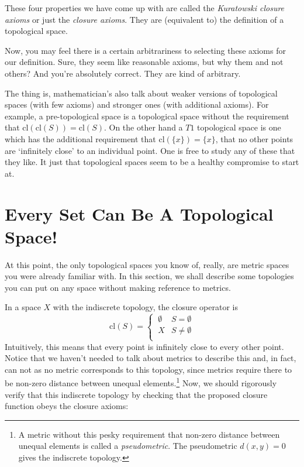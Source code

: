 \documentclass{report}
\newcommand{\cl}{\mathrm{cl}}
\begin{document}
These four properties we have come up with are called the \emph{Kuratowski closure axioms} or just the \emph{closure axioms}. They are (equivalent to) the definition of a topological space.

Now, you may feel there is a certain arbitrariness to selecting these axioms for our definition. Sure, they seem like reasonable axioms, but why them and not others? And you're absolutely correct. They are kind of arbitrary.

The thing is, mathematician's also talk about weaker versions of topological spaces (with few axioms) and stronger ones (with additional axioms). For example, a pre-topological space is a topological space without the requirement that $\cl(\cl(S)) = \cl(S)$. On the other hand a $T1$ topological space is one which has the additional requirement that $\cl(\{x\}) = \{x\}$, that no other points are `infinitely close' to an individual point. One is free to study any of these that they like. It just that topological spaces seem to be a healthy compromise to start at.

\section{Every Set Can Be A Topological Space!}

At this point, the only topological spaces you know of, really, are metric spaces you were already familiar with. In this section, we shall describe some topologies you can put on any space without making reference to metrics.

In a space $X$ with the indiscrete topology, the closure operator is $$\cl(S) = \begin{cases} ~∅ & S = ∅\\ ~X & S \neq ∅\\ \end{cases} $$ Intuitively, this means that every point is infinitely close to every other point. Notice that we haven't needed to talk about metrics to describe this and, in fact, can not as no metric corresponds to this topology, since metrics require there to be non-zero distance between unequal elements.\footnote{A metric without this pesky requirement that non-zero distance between unequal elements is called a \emph{pseudometric}. The pseudometric $d(x,y) = 0$ gives the indiscrete topology.} Now, we should rigorously verify that this indiscrete topology by checking that the proposed closure function obeys the closure axioms:
\end{document}
